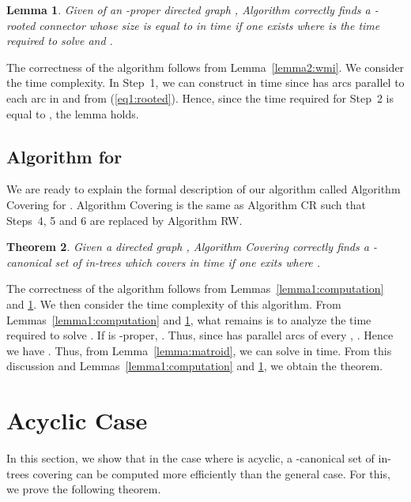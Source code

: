 \documentclass[11pt]{article}
\newcounter{ni}
\theoremstyle{plain}
\newtheorem{theorem}{Theorem}[section]
\newtheorem{lemma}[theorem]{Lemma}\newtheorem{corollary}[theorem]{Corollary}\newtheorem{definition}[theorem]{Definition}\newtheorem{proposition}[theorem]{Proposition}\newtheorem{claim}[theorem]{Claim}\newtheorem{fact}[theorem]{Fact}\newtheorem{example}{Example}
\newcommand{\eop}{\hfill \usebox{\ProofSym}}
\newenvironment{proof}{\noindent {\it Proof.}}{\eop\par\vspace{0.3cm}}
\begin{document}
\begin{lemma} \label{lemma2:computation}
Given  of an -proper directed graph , Algorithm  correctly 
finds a -rooted connector whose size is equal to 
in  time if one exists where 
 is the time required to solve  and 
.
\end{lemma}
\begin{proof}
The correctness of the algorithm follows from Lemma~\ref{lemma2:wmi}. We consider the time 
complexity. In Step~1, we can construct  in  time 
since  has  arcs 
parallel to each arc in  and from (\ref{eq1:rooted}). 
Hence, since the time required for Step~2 is equal to ,
the lemma holds.  
\end{proof}

\subsection{Algorithm for }

We are ready to explain the formal description of our algorithm 
called Algorithm {\sf Covering} for .
Algorithm {\sf Covering} is the same as Algorithm {\sf CR} such that 
Steps~4, 5 and 6 are replaced by Algorithm {\sf RW}.

\begin{theorem}
Given a directed graph  , Algorithm {\sf Covering} correctly finds 
a -canonical set of in-trees which covers  in  time 
if one exits where .
\end{theorem}
\begin{proof}
The correctness of the algorithm follows from Lemmas~\ref{lemma1:computation} and 
\ref{lemma2:computation}. We then consider the time complexity of this algorithm.
From Lemmas~\ref{lemma1:computation} and \ref{lemma2:computation}, 
what remains is to analyze the time required to solve . 
If  is -proper,  
\sum\sum.  
Thus, since  has  parallel arcs of every ,  
\sum.
Hence we have . 
Thus, from Lemma~\ref{lemma:matroid}, we can solve  in 
 time. 
From this discussion and Lemmas~\ref{lemma1:computation} 
and \ref{lemma2:computation}, we obtain the theorem.  
\end{proof}

\section{Acyclic Case}
\label{Acyclic Case}

In this section, we show that in the case where  is acyclic, 
a -canonical set of in-trees covering  
can be computed more efficiently than the general case. 
For this, we prove the following theorem. 
\end{document}
